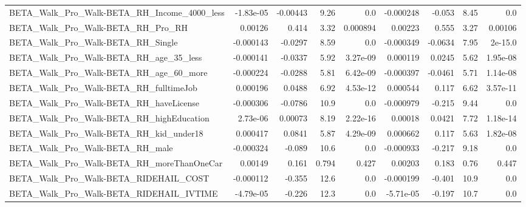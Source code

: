 \begin{tabular}{lrrrrrrrr}
BETA\_Walk\_Pro\_Walk-BETA\_RH\_Income\_4000\_less        &   -1.83e-05 &     -0.00443 &      9.26 &      0.0 &  -0.000248 &      -0.053 &         8.45 &           0.0 \\
BETA\_Walk\_Pro\_Walk-BETA\_RH\_Pro\_RH                  &     0.00126 &        0.414 &      3.32 & 0.000894 &    0.00223 &       0.555 &         3.27 &       0.00106 \\
BETA\_Walk\_Pro\_Walk-BETA\_RH\_Single                  &   -0.000143 &      -0.0297 &      8.59 &      0.0 &  -0.000349 &     -0.0634 &         7.95 &       2e-15.0 \\
BETA\_Walk\_Pro\_Walk-BETA\_RH\_age\_35\_less             &   -0.000141 &      -0.0337 &      5.92 & 3.27e-09 &   0.000119 &      0.0245 &         5.62 &      1.95e-08 \\
BETA\_Walk\_Pro\_Walk-BETA\_RH\_age\_60\_more             &   -0.000224 &      -0.0288 &      5.81 & 6.42e-09 &  -0.000397 &     -0.0461 &         5.71 &      1.14e-08 \\
BETA\_Walk\_Pro\_Walk-BETA\_RH\_fulltimeJob             &    0.000196 &       0.0488 &      6.92 & 4.53e-12 &   0.000544 &       0.117 &         6.62 &      3.57e-11 \\
BETA\_Walk\_Pro\_Walk-BETA\_RH\_haveLicense             &   -0.000306 &      -0.0786 &      10.9 &      0.0 &  -0.000979 &      -0.215 &         9.44 &           0.0 \\
BETA\_Walk\_Pro\_Walk-BETA\_RH\_highEducation           &    2.73e-06 &      0.00073 &      8.19 & 2.22e-16 &    0.00018 &      0.0421 &         7.72 &      1.18e-14 \\
BETA\_Walk\_Pro\_Walk-BETA\_RH\_kid\_under18             &    0.000417 &       0.0841 &      5.87 & 4.29e-09 &   0.000662 &       0.117 &         5.63 &      1.82e-08 \\
BETA\_Walk\_Pro\_Walk-BETA\_RH\_male                    &   -0.000324 &       -0.089 &      10.6 &      0.0 &  -0.000933 &      -0.217 &         9.18 &           0.0 \\
BETA\_Walk\_Pro\_Walk-BETA\_RH\_moreThanOneCar          &     0.00149 &        0.161 &     0.794 &    0.427 &    0.00203 &       0.183 &         0.76 &         0.447 \\
BETA\_Walk\_Pro\_Walk-BETA\_RIDEHAIL\_COST              &   -0.000112 &       -0.355 &      12.6 &      0.0 &  -0.000199 &      -0.401 &         10.9 &           0.0 \\
BETA\_Walk\_Pro\_Walk-BETA\_RIDEHAIL\_IVTIME            &   -4.79e-05 &       -0.226 &      12.3 &      0.0 &  -5.71e-05 &      -0.197 &         10.7 &           0.0 \\

\end{tabular}
